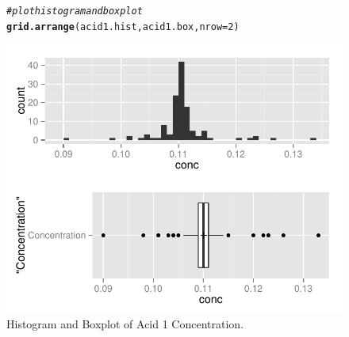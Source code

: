 \documentclass{article}\usepackage[]{graphicx}\usepackage[]{color}
\makeatletter
\def\maxwidth{ %
  \ifdim\Gin@nat@width>\linewidth
    \linewidth
  \else
    \Gin@nat@width
  \fi
}
\newcommand{\hlnum}[1]{\textcolor[rgb]{0.686,0.059,0.569}{#1}}%
\newcommand{\hlcom}[1]{\textcolor[rgb]{0.678,0.584,0.686}{\textit{#1}}}%
\newcommand{\hlstd}[1]{\textcolor[rgb]{0.345,0.345,0.345}{#1}}%
\newcommand{\hlkwc}[1]{\textcolor[rgb]{0.333,0.667,0.333}{#1}}%
\newcommand{\hlkwd}[1]{\textcolor[rgb]{0.737,0.353,0.396}{\textbf{#1}}}%
\newenvironment{kframe}{%
 \def\at@end@of@kframe{}%
 \ifinner\ifhmode%
  \def\at@end@of@kframe{\end{minipage}}%
  \begin{minipage}{\columnwidth}%
 \fi\fi%
 \def\FrameCommand##1{\hskip\@totalleftmargin \hskip-\fboxsep
 \colorbox{shadecolor}{##1}\hskip-\fboxsep
     \hskip-\linewidth \hskip-\@totalleftmargin \hskip\columnwidth}%
 \MakeFramed {\advance\hsize-\width
   \@totalleftmargin\z@ \linewidth\hsize
   \@setminipage}}%
 {\par\unskip\endMakeFramed%
 \at@end@of@kframe}
\newenvironment{knitrout}{}{} %
\makeatother
\begin{document}
\begin{figure}[H]  \begin{center}
\begin{knitrout}
\color{fgcolor}\begin{kframe}
\begin{alltt}
\hlcom{# plot histogram and boxplot}
\hlkwd{grid.arrange}\hlstd{(acid1.hist, acid1.box,} \hlkwc{nrow} \hlstd{=} \hlnum{2}\hlstd{)}
\end{alltt}
\end{kframe}
\includegraphics[width=\maxwidth]{figure/2_acid1_boxplot} 

\end{knitrout}
\end{center} \caption{Histogram and Boxplot of Acid 1 Concentration.} \end{figure}
\end{document}
